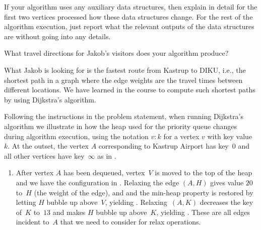 \documentclass{jn-pset}
\begin{document}
\begin{problem}
\begin{subproblem}
    If your algorithm uses any auxiliary data structures, then explain in detail
    for the first two vertices processed how these data structures
    change. For the rest of the algorithm execution, just
    report what the relevant outputs of the data structures are without
    going into any details.
   
    What travel directions for Jakob's visitors does your algorithm produce?    
  \end{subproblem}
  

\begin{solution}
  What Jakob is looking for is the fastest route from Kastrup to DIKU,
  i.e., the shortest path in a graph where the edge weights are the
  travel times between different locations.
  We have learned in the course to compute such shortest paths by
  using Dijkstra's algorithm.

  

%     
%   
  Following the instructions in the problem statement,
  when running Dijkstra's algorithm 
  we illustrate in
  how the heap used for the priority queue changes during 
  algorithm execution,
  using the
  notation $v:k$
  for a vertex $v$ with key value~$k$.
  At the outset, the vertex $A$
  corresponding to Kastrup Airport
  has key~$0$ and all other
  vertices have key~$\infty$ as in .

  \begin{enumerate}
  \item 
    After vertex $A$ has been dequeued, vertex~$V$ is moved to the top of the heap
    and we have the configuration in
    .
    Relaxing the edge $(A, H)$ gives value $20$ to~$H$ (\ie the weight
    of the edge), and 
    and the min-heap property is restored by letting $H$ bubble up above~$V$, 
    yielding
    .
    Relaxing~$(A, K)$
    decreases the key of~$K$ to~$13$ and
    makes $H$ bubble up above~$K$, yielding
    .
    These are all edges incident to~$A$ that we need to consider for
    relax operations.
    

\end{enumerate}
\end{solution}
\end{problem}
\end{document}

